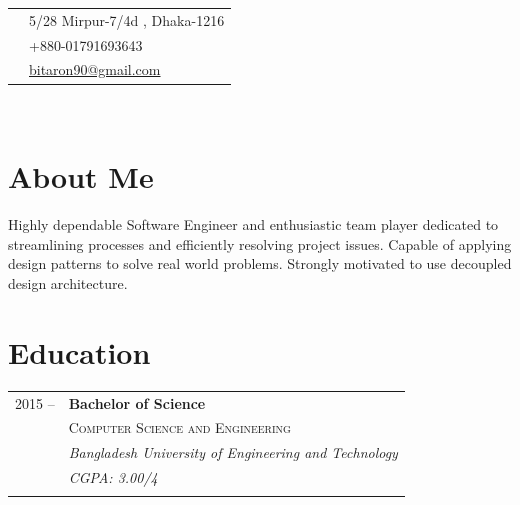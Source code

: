\documentclass[10pt]{article} %
\begin{document}
{\begin{minipage}[t]{0.44\textwidth}
\begin{minipage}[t]{0.44\textwidth} %
\vspace{0pt} 
{\raggedright	
\colorbox{shade}{\textcolor{text1}{
\begin{tabular}{c|p{7cm}}
\raisebox{-4pt}{\textifsymbol{18}} & 5/28 Mirpur-7/4d , Dhaka-1216 \\ %
\raisebox{-3pt}{\Mobilefone} & +880-01791693643 \\ %
\raisebox{-1pt}{\Letter} & \href{mailto:bitaron90@gmail.com}{bitaron90@gmail.com} \\ %
\end{tabular}
}
}\\[10pt]
}
\end{minipage}

\section{About Me}
\normalsize{Highly dependable Software Engineer and enthusiastic team player dedicated to streamlining processes and efficiently resolving project issues. Capable of applying design patterns to solve real world problems. Strongly motivated to use decoupled design architecture.}\\

\section{Education} 

\begin{tabular}{rl} %


2015 --  & \textbf{Bachelor of Science} \\ 
& \textsc{Computer Science and Engineering} \\ 
& \textit{Bangladesh University of Engineering and Technology}\\
& \textit{CGPA: 3.00/4}\\
&\\
	 


\end{tabular}
\end{minipage}}
\end{document}

